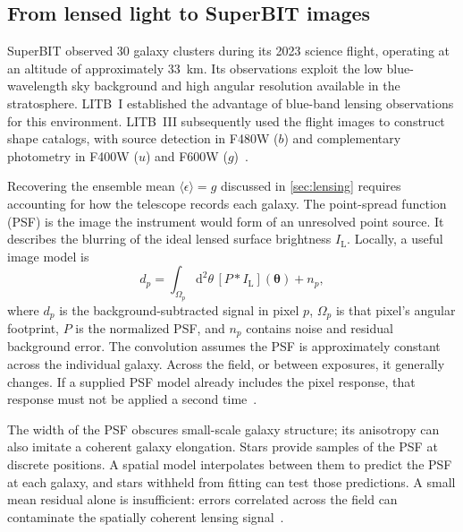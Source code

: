 \subsection{From lensed light to SuperBIT images}
\label{sec:images}


SuperBIT observed 30 galaxy clusters during its 2023 science flight, operating at an altitude of approximately \qty{33}{\kilo\metre}. Its observations exploit the low blue-wavelength sky background and high angular resolution available in the stratosphere. LITB~I established the advantage of blue-band lensing observations for this environment. LITB~III subsequently used the flight images to construct shape catalogs, with source detection in F480W ($b$) and complementary photometry in F400W ($u$) and F600W ($g$)~\cite{shaaban_weak_2022,saha_lensing_2026-1}.

Recovering the ensemble mean $\langle\epsilon\rangle=g$ discussed in \cref{sec:lensing} requires accounting for how the telescope records each galaxy. The point-spread function (PSF) is the image the instrument would form of an unresolved point source. It describes the blurring of the ideal lensed surface brightness $I_{\mathrm{L}}$. Locally, a useful image model is~\cite{rowe_galsim_2015,mandelbaum_weak_2018}
\begin{equation}
    d_p=\int_{\Omega_p}\!\mathrm{d}^2\theta\,
    [P*I_{\mathrm{L}}](\boldsymbol{\theta})+n_p,
    \label{eq:image-model}
\end{equation}
where $d_p$ is the background-subtracted signal in pixel $p$, $\Omega_p$ is that pixel's angular footprint, $P$ is the normalized PSF, and $n_p$ contains noise and residual background error. The convolution assumes the PSF is approximately constant across the individual galaxy. Across the field, or between exposures, it generally changes. If a supplied PSF model already includes the pixel response, that response must not be applied a second time~\cite{rowe_galsim_2015,mandelbaum_weak_2018}.

The width of the PSF obscures small-scale galaxy structure; its anisotropy can also imitate a coherent galaxy elongation. Stars provide samples of the PSF at discrete positions. A spatial model interpolates between them to predict the PSF at each galaxy, and stars withheld from fitting can test those predictions. A small mean residual alone is insufficient: errors correlated across the field can contaminate the spatially coherent lensing signal~\cite{rowe_improving_2010}.


